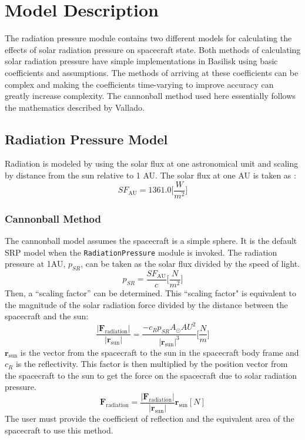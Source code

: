 \section{Model Description}
The radiation pressure module contains two different models for calculating the effects of solar radiation pressure on spacecraft state. Both methods of calculating solar radiation pressure have simple implementations in Basilisk using basic coefficients and assumptions. The methods of arriving at these coefficients can be complex and making the coefficients time-varying to improve accuracy can greatly increase complexity. The cannonball method used here essentially follows the mathematics described by Vallado\cite{vallado2001}.

\subsection{Radiation Pressure Model}
Radiation is modeled by using the solar flux at one astronomical unit and scaling by distance from the sun relative to 1 AU. The solar flux at one AU is taken as :
\begin{equation}
SF_{\mathrm{AU}} = 1361.0    \bigg[\frac{W}{m^2}\bigg]
\end{equation}
\subsubsection{Cannonball Method}
The cannonball model assumes the spacecraft is a simple sphere.  It is the default SRP model when the {\tt RadiationPressure} module is invoked.  The radiation pressure at 1AU, $p_{SR}$, can be taken as the solar flux divided by the speed of light.
\begin{equation}
	p_{SR} = \frac{SF_{\mathrm{AU}}}{c} \bigg[\frac{N}{m^2}\bigg]
\end{equation}
Then, a ``scaling factor'' can be determined. This ``scaling factor" is equivalent to the magnitude of the solar radiation force divided by the distance between the spacecraft and the sun:
\begin{equation}
	\frac{|\mathbf{F}_{\textrm{radiation}}|}{|\mathbf{r}_{\textrm{sun}}|} = \frac{-c_{R}p_{SR}A_{\odot}{AU}^2}{|\mathbf{r}_{\textrm{sun}}|^3} \bigg[\frac{N}{m}\bigg]
\end{equation}
$\mathbf{r}_{\textrm{sun}}$ is the vector from the spacecraft to the sun in the spacecraft body frame and $c_R$ is the reflectivity. This factor is then multiplied by the position vector from the spacecraft to the sun to get the force on the spacecraft due to solar radiation pressure.
\begin{equation}
	{\mathbf{F}_{\textrm{radiation}}} = \frac{|\mathbf{F}_{\textrm{radiation}}|}{|\mathbf{r}_{\textrm{sun}}|}  \mathbf{r}_{\textrm{sun}} [N]
\end{equation}
The user must provide the coefficient of reflection and the equivalent area of the spacecraft to use this method.\\
